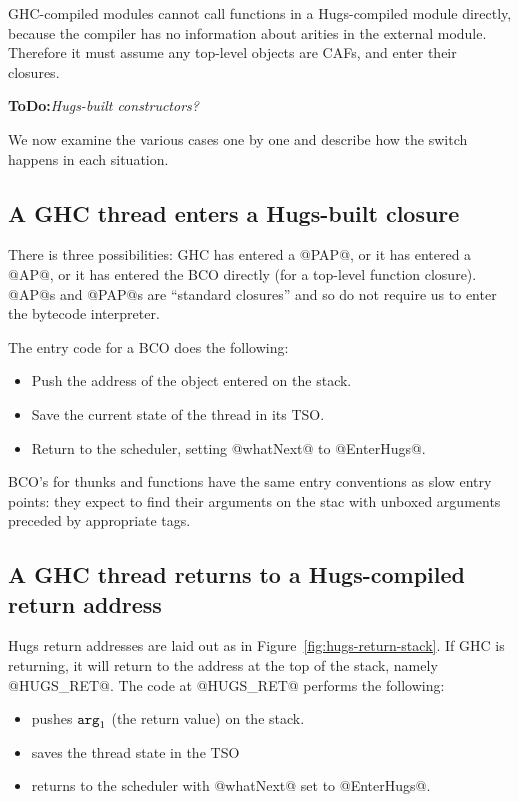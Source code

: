 \documentclass[11pt]{article}
\newcommand{\ToDo}[1]{{{\bf ToDo:}\sl #1}}
\newcommand{\Arg}[1]{\mbox{${\tt arg}_{#1}$}}
\newcommand{\figref}[1]{Figure~\ref{fig:#1}}
\begin{document}
GHC-compiled modules cannot call functions in a Hugs-compiled module
directly, because the compiler has no information about arities in the
external module.  Therefore it must assume any top-level objects are
CAFs, and enter their closures.

\ToDo{Hugs-built constructors?}

We now examine the various cases one by one and describe how the
switch happens in each situation.

\subsection{A GHC thread enters a Hugs-built closure}
\label{sec:ghc-to-hugs-switch}

There is three possibilities: GHC has entered a @PAP@, or it has
entered a @AP@, or it has entered the BCO directly (for a top-level
function closure).  @AP@s and @PAP@s are ``standard closures'' and
so do not require us to enter the bytecode interpreter.

The entry code for a BCO does the following:

\begin{itemize}
\item Push the address of the object entered on the stack.
\item Save the current state of the thread in its TSO.
\item Return to the scheduler, setting @whatNext@ to @EnterHugs@.
\end{itemize}

BCO's for thunks and functions have the same entry conventions as
slow entry points: they expect to find their arguments on the stac
with unboxed arguments preceded by appropriate tags.

\subsection{A GHC thread returns to a Hugs-compiled return address}
\label{sec:ghc-to-hugs-switch}

Hugs return addresses are laid out as in \figref{hugs-return-stack}.
If GHC is returning, it will return to the address at the top of the
stack, namely @HUGS_RET@.  The code at @HUGS_RET@ performs the
following:

\begin{itemize}
\item pushes \Arg{1} (the return value) on the stack.
\item saves the thread state in the TSO
\item returns to the scheduler with @whatNext@ set to @EnterHugs@.
\end{itemize}
\end{document}
